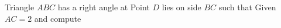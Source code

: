 Triangle $ABC$ has a right angle at   Point $D$ lies on side $BC$ such that  Given $AC=2$ and  compute 